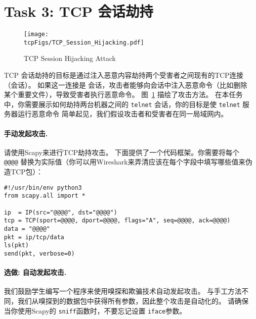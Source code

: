             


\section{Task 3: TCP 会话劫持}



\begin{figure}[htb]
  \begin{center}
    \texttt{[image: \\tcpFigs/TCP\_Session\_Hijacking.pdf]}
  \end{center}
  \caption{TCP Session Hijacking Attack}
  \label{tcp:fig:hijacking}
\end{figure}
 
   
TCP 会话劫持的目标是通过注入恶意内容劫持两个受害者之间现有的TCP连接（会话）。
如果这一连接是 \telnet 会话，攻击者能够向会话中注入恶意命令（比如删除某个重要文件），导致受害者执行恶意命令。
图~\ref{tcp:fig:hijacking} 描绘了攻击方法。
在本任务中，你需要展示如何劫持两台机器之间的 \texttt{telnet} 会话，你的目标是使 \texttt{telnet} 服务器运行恶意命令
简单起见，我们假设攻击者和受害者在同一局域网内。



\paragraph{手动发起攻击.}
请使用Scapy来进行TCP劫持攻击。
下面提供了一个代码框架。你需要将每个 \texttt{@@@@} 替换为实际值（你可以用Wireshark来弄清应该在每个字段中填写哪些值来伪造TCP包）：


\begin{lstlisting}
#!/usr/bin/env python3
from scapy.all import *

ip  = IP(src="@@@@", dst="@@@@")
tcp = TCP(sport=@@@@, dport=@@@@, flags="A", seq=@@@@, ack=@@@@)
data = "@@@@"
pkt = ip/tcp/data
ls(pkt)
send(pkt, verbose=0)
\end{lstlisting}


\paragraph{选做: 自动发起攻击.}
我们鼓励学生编写一个程序来使用嗅探和欺骗技术自动发起攻击。
与手工方法不同，我们从嗅探到的数据包中获得所有参数，因此整个攻击是自动化的。 
请确保当你使用Scapy的 \texttt{sniff}函数时，不要忘记设置 \texttt{iface}参数。





